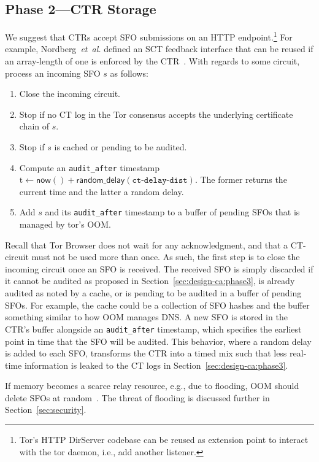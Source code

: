 \subsection{Phase 2---CTR Storage} \label{sec:design-ca:phase2}
We suggest that CTRs accept SFO submissions on an HTTP endpoint.\footnote{%
	Tor's HTTP DirServer codebase can be reused as extension point to interact
	with the tor daemon, i.e., add another listener.
} For example, Nordberg~\emph{et~al.} defined an SCT feedback interface that can
be reused if an array-length of one is enforced by the CTR~\cite{nordberg}.
With regards to some circuit, process an incoming SFO $s$ as follows:
\begin{enumerate}
	\item\label{enm:ctr-api:close} Close the incoming circuit.
	\item\label{enm:ctr-api:unrecognized} Stop if no CT log in the Tor consensus
		accepts the underlying certificate chain of $s$.
	\item\label{enm:ctr-api:cached}
		Stop if $s$ is cached or pending to be audited.
	\item\label{enm:ctr-api:audit-after} Compute an \texttt{audit\_after}
		timestamp $\textrm{t} \gets \mathsf{now()} +
			\mathsf{random\_delay}(\texttt{ct-delay-dist})$.
		The former returns the current time and the latter a random delay.
	\item\label{enm:ctr-api:store}
		Add $s$ and its \texttt{audit\_after} timestamp to a buffer of
		pending SFOs that is managed by tor's OOM.
\end{enumerate}

Recall that Tor Browser does not wait for any acknowledgment, and that a
CT-circuit must not be used more than once.  As such, the first step is to
close the incoming circuit once an SFO is received.  The received SFO is
simply discarded if it
	cannot be audited as proposed in Section~\ref{sec:design-ca:phase3},
	is already audited as noted by a cache, or
	is pending to be audited in a buffer of pending SFOs.
For example, the cache could be a collection of SFO hashes and the buffer
something similar to how OOM manages DNS.  A new SFO is stored in the CTR's
buffer alongside an \texttt{audit\_after} timestamp, which specifies the
earliest point in time that the SFO will be audited.  This behavior, where a
random delay is added to each SFO, transforms the CTR into a timed mix such that
less real-time information is leaked to the CT logs in
Section~\ref{sec:design-ca:phase3}.

If memory becomes a scarce relay resource, e.g., due to flooding, OOM
should delete SFOs at random~\cite{nordberg}.  The threat of flooding is
discussed further in Section~\ref{sec:security}.

